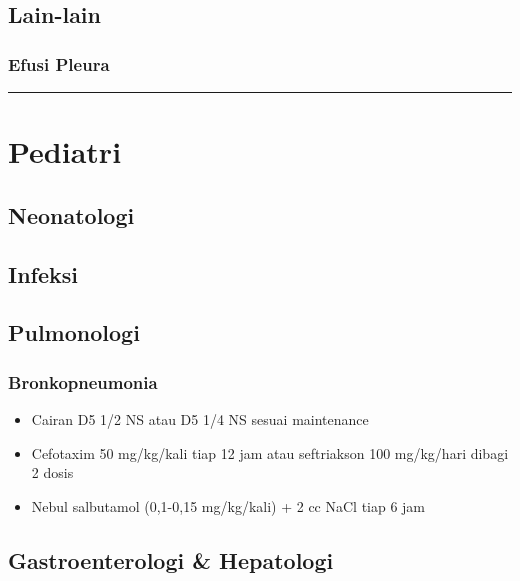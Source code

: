 \documentclass[
]{book}
\providecommand{\tightlist}{%
  \setlength{\itemsep}{0pt}\setlength{\parskip}{0pt}}
\begin{document}
\hypertarget{lain-lain}{%
\subsection{Lain-lain}\label{lain-lain}}

\hypertarget{efusi-pleura}{%
\subsubsection{Efusi Pleura}\label{efusi-pleura}}

\begin{center}\rule{0.5\linewidth}{0.5pt}\end{center}

\hypertarget{pediatri-1}{%
\section{Pediatri}\label{pediatri-1}}

\hypertarget{neonatologi}{%
\subsection{Neonatologi}\label{neonatologi}}

\hypertarget{infeksi-2}{%
\subsection{Infeksi}\label{infeksi-2}}

\hypertarget{pulmonologi-2}{%
\subsection{Pulmonologi}\label{pulmonologi-2}}

\hypertarget{bronkopneumonia}{%
\subsubsection{Bronkopneumonia}\label{bronkopneumonia}}

\begin{itemize}
\tightlist
\item
  Cairan D5 1/2 NS atau D5 1/4 NS sesuai maintenance
\item
  Cefotaxim 50 mg/kg/kali tiap 12 jam atau seftriakson 100 mg/kg/hari dibagi 2 dosis
\item
  Nebul salbutamol (0,1-0,15 mg/kg/kali) + 2 cc NaCl tiap 6 jam
\end{itemize}

\hypertarget{gastroenterologi-hepatologi-1}{%
\subsection{Gastroenterologi \& Hepatologi}\label{gastroenterologi-hepatologi-1}}
\end{document}
